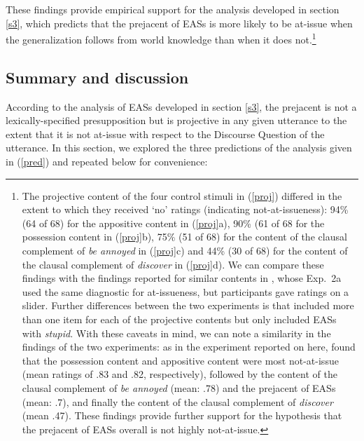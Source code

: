 \documentclass[11pt,fleqn]{article}
\newcommand{\6}{\mbox{$[\hspace*{-.6mm}[$}}
\newcommand{\9}{\mbox{$]\hspace*{-.6mm}]$}}
\begin{document}
These findings provide empirical support for the analysis developed in section \ref{s3}, which predicts that the prejacent of EASs is more likely to be at-issue when the generalization follows from world knowledge than when it does not.\footnote{The projective content of the four control stimuli in (\ref{proj}) differed in the extent to which they received `no' ratings (indicating not-at-issueness): 94\% (64 of 68) for the appositive content in (\ref{proj}a), 90\% (61 of 68 for the possession content in (\ref{proj}b), 75\% (51 of 68) for the content of the clausal complement of {\em be annoyed} in (\ref{proj}c) and 44\% (30 of 68) for the content of the clausal complement of {\em discover} in (\ref{proj}d). We can compare these findings with the findings reported for similar contents in \citealt{tbd-variability}, whose Exp.~2a used the same diagnostic for at-issueness, but participants gave ratings on a slider. Further differences between the two experiments is that \citealt{tbd-variability} included more than one item for each of the projective contents but only included EASs with {\em stupid}. With these caveats in mind, we can note a similarity in the findings of the two experiments: as in the experiment reported on here, \citet{tbd-variability} found that the possession content and appositive content were most not-at-issue (mean ratings of .83 and .82, respectively), followed by the content of the clausal complement of {\em be annoyed} (mean: .78) and the prejacent of EASs (mean: .7), and finally the content of the clausal complement of {\em discover} (mean .47). These findings provide further support for the hypothesis that the prejacent of EASs overall is not highly not-at-issue.}



  
\subsection{Summary and discussion}

According to the analysis of EASs developed in section \ref{s3}, the prejacent is not a lexically-specified presupposition but is projective in any given utterance to the extent that it is not at-issue with respect to the Discourse Question of the utterance. In this section, we explored the three predictions of the analysis given in (\ref{pred}) and repeated below for convenience:
\end{document}
